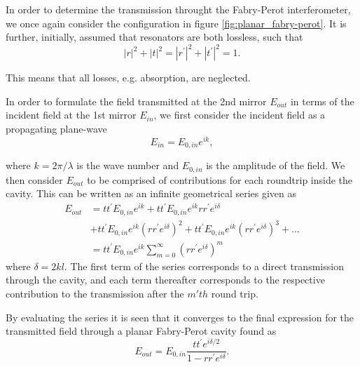 In order to determine the transmission throught the Fabry-Perot interferometer, we once again consider the configuration in figure \ref{fig:planar_fabry-perot}. It is further, initially, assumed that resonators are both lossless, such that
\begin{equation}
    |r|^2 + |t|^2 = |r^{\prime}|^2 + |t^{\prime}|^2 = 1.
    \label{eq:lossless_condition}
\end{equation}

This means that all losses, e.g. absorption, are neglected. 

In order to formulate the field transmitted at the 2nd mirror $E_{out}$ in terms of the incident field at the 1st mirror $E_{in}$, we first consider the incident field as a propagating plane-wave
\begin{equation}
    E_{in} = E_{0,in} e^{ik},
\end{equation}

where $k = 2 \pi / \lambda$ is the wave number and $E_{0,in}$ is the amplitude of the field. We then consider $E_{out}$ to be comprised of contributions for each roundtrip inside the cavity. This can be written as an infinite geometrical series given as
\begin{equation}
    \begin{split}
        E_{out} & = tt^{\prime} E_{0,in} e^{ik} + tt^{\prime} E_{0,in} e^{ik} rr^{\prime} e^{i\delta}\\&+ tt^{\prime} E_{0,in} e^{ik} \left(rr^{\prime} e^{i\delta}\right)^2 + tt^{\prime} E_{0,in} e^{ik} \left(rr^{\prime} e^{i\delta}\right)^3 + ...\\& = tt^{\prime} E_{0,in} e^{ik} \sum^{\infty}_{m=0}\left( rr^{\prime}e^{i\delta} \right)^m
    \end{split}
    \label{eq:transmission_as_geometric_series}
\end{equation}
where $\delta = 2kl$. The first term of the series corresponds to a direct transmission through the cavity, and each term thereafter corresponds to the respective contribution to the transmission after the $m'th$ round trip. 

By evaluating the series it is seen that it converges to the final expression for the transmitted field through a planar Fabry-Perot cavity found as
\begin{equation}
    E_{out} = E_{0,in}\frac{tt^{\prime} e^{i\delta /2}}{1 - rr^{\prime} e^{i\delta}}.
    \label{eq:fabry_perot_trans}
\end{equation}

